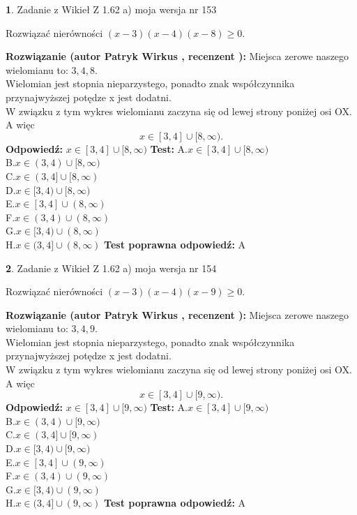 \documentclass[12pt, a4paper]{article}
\theoremstyle{definition} %
\newtheorem{zad}{}
\newcommand{\zadStart}[1]{\begin{zad}#1\newline}
\newcommand{\zadStop}{\end{zad}}
\newcommand{\rozwStart}[2]{\noindent \textbf{Rozwiązanie (autor #1 , recenzent #2): }\newline}
\newcommand{\rozwStop}{\newline}
\newcommand{\odpStart}{\noindent \textbf{Odpowiedź:}\newline}
\newcommand{\odpStop}{\newline}
\newcommand{\testStart}{\noindent \textbf{Test:}\newline}
\newcommand{\testStop}{\newline}
\newcommand{\kluczStart}{\noindent \textbf{Test poprawna odpowiedź:}\newline}
\newcommand{\kluczStop}{\newline}
\begin{document}
\zadStart{Zadanie z Wikieł Z 1.62 a) moja wersja nr 153}

Rozwiązać nierówności $(x-3)(x-4)(x-8)\ge0$.
\zadStop
\rozwStart{Patryk Wirkus}{}
Miejsca zerowe naszego wielomianu to: $3, 4, 8$.\\
Wielomian jest stopnia nieparzystego, ponadto znak współczynnika przy\linebreak najwyższej potędze x jest dodatni.\\ W związku z tym wykres wielomianu zaczyna się od lewej strony poniżej osi OX. A więc $$x \in [3,4] \cup [8,\infty).$$
\rozwStop
\odpStart
$x \in [3,4] \cup [8,\infty)$
\odpStop
\testStart
A.$x \in [3,4] \cup [8,\infty)$\\
B.$x \in (3,4) \cup [8,\infty)$\\
C.$x \in (3,4] \cup [8,\infty)$\\
D.$x \in [3,4) \cup [8,\infty)$\\
E.$x \in [3,4] \cup (8,\infty)$\\
F.$x \in (3,4) \cup (8,\infty)$\\
G.$x \in [3,4) \cup (8,\infty)$\\
H.$x \in (3,4] \cup (8,\infty)$
\testStop
\kluczStart
A
\kluczStop



\zadStart{Zadanie z Wikieł Z 1.62 a) moja wersja nr 154}

Rozwiązać nierówności $(x-3)(x-4)(x-9)\ge0$.
\zadStop
\rozwStart{Patryk Wirkus}{}
Miejsca zerowe naszego wielomianu to: $3, 4, 9$.\\
Wielomian jest stopnia nieparzystego, ponadto znak współczynnika przy\linebreak najwyższej potędze x jest dodatni.\\ W związku z tym wykres wielomianu zaczyna się od lewej strony poniżej osi OX. A więc $$x \in [3,4] \cup [9,\infty).$$
\rozwStop
\odpStart
$x \in [3,4] \cup [9,\infty)$
\odpStop
\testStart
A.$x \in [3,4] \cup [9,\infty)$\\
B.$x \in (3,4) \cup [9,\infty)$\\
C.$x \in (3,4] \cup [9,\infty)$\\
D.$x \in [3,4) \cup [9,\infty)$\\
E.$x \in [3,4] \cup (9,\infty)$\\
F.$x \in (3,4) \cup (9,\infty)$\\
G.$x \in [3,4) \cup (9,\infty)$\\
H.$x \in (3,4] \cup (9,\infty)$
\testStop
\kluczStart
A
\kluczStop
\end{document}
